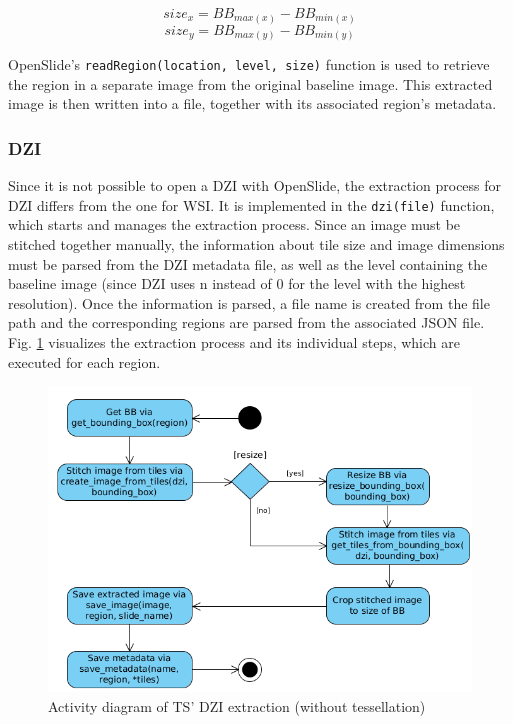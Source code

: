 \begin{equation}\label{eq:sizeX}
size_x = BB_{max(x)} - BB_{min(x)}
\end{equation}
\begin{equation}\label{eq:sizey}
size_y = BB_{max(y)} - BB_{min(y)}
\end{equation}

OpenSlide's \texttt{readRegion(location, level, size)} function is used to retrieve the region in a separate image from the original baseline image. This extracted image is then written into a file, together with its associated region's metadata.

\subsubsection{DZI}
Since it is not possible to open a DZI with OpenSlide, the extraction process for DZI differs from the one for WSI. It is implemented in the \texttt{dzi(file)} function, which starts and manages the extraction process. Since an image must be stitched together manually, the information about tile size and image dimensions must be parsed from the DZI metadata file, as well as the level containing the baseline image (since DZI uses n instead of 0 for the level with the highest resolution). Once the information is parsed, a file name is created from the file path and the corresponding regions are parsed from the associated JSON file. Fig. \ref{fig5_tsDziUml} visualizes the extraction process and its individual steps, which are executed for each region.

\begin{figure}[!h]
	\begin{center}
		\includegraphics[scale=0.45]{img/ts_dzi_uml.png}
		\caption{Activity diagram of TS' DZI extraction (without tessellation)}
		\label{fig5_tsDziUml}
	\end{center}
\end{figure}

